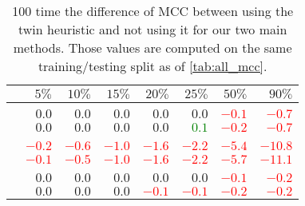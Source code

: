 \begin{table}[htpb]
  \centering
  \vspace{-\baselineskip}
  \small
  \caption{%
    100 time the difference of MCC between using the twin heuristic and not using it for our
  two main methods. Those values are computed on the same training/testing split as of
\autoref{tab:all_mcc}.\label{tab:twin}}
  \begin{tabular}{lrrrrrrr}
    \toprule
                                & $5\%$                    & $10\%$                   & $15\%$                   & $20\%$                   & $25\%$                   & $50\%$                   & $90\%$                   \\
    \midrule
    & \multicolumn{7}{c}{\aut{}} \\ \cmidrule(lr){2-8}
    \uslpropGsecTwin{}          & $0.0$                    & $0.0$                    & $0.0$                    & $0.0$                    & $0.0$                    & \textcolor{Red}{$-0.1$}  & \textcolor{Red}{$-0.7$}  \\
    \usruleTwin{}               & $0.0$                    & $0.0$                    & $0.0$                    & $0.0$                    & \textcolor{Green}{$0.1$} & \textcolor{Red}{$-0.2$}  & \textcolor{Red}{$-0.7$}  \\
    & \multicolumn{7}{c}{\adv{}} \\ \cmidrule(lr){2-8}
    \uslpropGsecTwin{}          & \textcolor{Red}{$-0.2$}  & \textcolor{Red}{$-0.6$}  & \textcolor{Red}{$-1.0$}  & \textcolor{Red}{$-1.6$}  & \textcolor{Red}{$-2.2$}  & \textcolor{Red}{$-5.4$}  & \textcolor{Red}{$-10.8$} \\
    \usruleTwin{}               & \textcolor{Red}{$-0.1$}  & \textcolor{Red}{$-0.5$}  & \textcolor{Red}{$-1.0$}  & \textcolor{Red}{$-1.6$}  & \textcolor{Red}{$-2.2$}  & \textcolor{Red}{$-5.7$}  & \textcolor{Red}{$-11.1$} \\
    & \multicolumn{7}{c}{\wik{}} \\ \cmidrule(lr){2-8}
    \uslpropGsecTwin{}          & $0.0$                    & $0.0$                    & $0.0$                    & $0.0$                    & $0.0$                    & \textcolor{Red}{$-0.1$}  & \textcolor{Red}{$-0.2$}  \\
    \usruleTwin{}               & $0.0$                    & $0.0$                    & $0.0$                    & \textcolor{Red}{$-0.1$}  & \textcolor{Red}{$-0.1$}  & \textcolor{Red}{$-0.2$}  & \textcolor{Red}{$-0.2$}  \\

\end{tabular}
\end{table}

